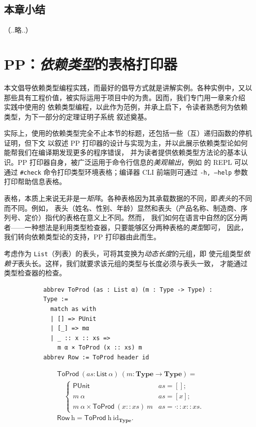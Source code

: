 \documentclass[a4paper, 11pt]{article}
\theoremstyle{remark}\newtheorem*{remark}{Remark}
\theoremstyle{definition}\newtheorem*{definition}{Definition}
\begin{document}
\subsection{本章小结}（..略..）
\section{PP：\emph{依赖类型}的表格打印器}
本文倡导依赖类型编程实践，而最好的倡导方式就是讲解实例。各种实例中，又以
那些具有工程价值，被实际运用于项目中的为贵。因而，我们专门用一章来介绍 \Tigris 实践中使用的
依赖类型编程，以此作为范例，并承上启下，令读者熟悉何为依赖类型，为下一部分的定理证明子系统 \Tigrisd 叙述奠基。

实际上，\Tigris 使用的依赖类型完全不止本节的标题，还包括一些（互）递归函数的停机证明，但下文
以叙述 PP 打印器的设计与实现为主，并以此展示依赖类型论如何能帮我们在编译期发现更多的程序错误，
并为读者提供依赖类型方法论的基本认识。PP 打印器自身，被广泛运用于命令行信息的\emph{美观输出}，例如
\Tigris 的 REPL 可以通过 \texttt{\#check} 命令打印类型环境表格；编译器 CLI 前端则可通过
\texttt{-h, --help} 参数打印帮助信息表格。

表格，本质上来说无非是一\emph{矩阵}。各种表格因为其承载数据的不同，即\emph{表头}的不同而不同。例如，
表头（姓名、性别、年龄）显然和表头（产品名称、制造商、序列号、定价）指代的表格在意义上不同。然而，
我们如何在语言中自然的区分两者——一种想法是利用类型检查器，只要能够区分两种表格的\emph{类型}即可，
因此，我们转向依赖类型论的支持，PP 打印器由此而生。

考虑作为 \texttt{List}（列表）的表头，可将其变换为\emph{动态长度}的元组，即
使元组类型\emph{依赖于}表头长。这样，我们就要求该元组的类型与长度必须与表头一致，
才能通过类型检查器的检查。

\begin{figure}[H]
  \begin{subfigure}[c]{0.5\textwidth}
  \begin{verbatim}
abbrev ToProd (as : List α) (m : Type -> Type) : Type :=
  match as with
  | [] => PUnit
  | [_] => mα
  | _ :: x :: xs =>
    m α × ToProd (x :: xs) m
abbrev Row := ToProd header id
\end{verbatim}
  \end{subfigure}%
  \begin{subfigure}[c]{0.5\textwidth}
    \begin{align*}
      &\mathsf{ToProd}\ (as : \mathsf{List}\ \alpha)\ (m : \mathbf{Type}\to\mathbf{Type}) =\\
      &\quad
      \begin{cases}
        \mathsf{PUnit} &as = [];\\
        m\ \alpha &as = [x];\\
        m\ \alpha \times \mathsf{ToProd}\ (x :: xs)\ m &as = \cdot :: x :: xs.
      \end{cases}\\
      &\mathsf{Row}\ \textit{h} = \mathsf{ToProd}\ \textit{h}\ \mathrm{id}_\mathbf{Type}.
    \end{align*}
  \end{subfigure}
\end{figure}
\end{document}
